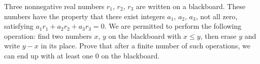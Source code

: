 Three nonnegative real numbers $ r_1$,  $ r_2$,  $ r_3$ are written on a blackboard. These numbers have the property that there exist integers $ a_1$,  $ a_2$,  $ a_3$,  not all zero, satisfying $ a_1r_1 + a_2r_2 + a_3r_3 = 0$. We are permitted to perform the following operation: find two numbers $ x$,  $ y$ on the blackboard with $ x \le y$,  then erase $ y$ and write $ y - x$ in its place. Prove that after a finite number of such operations, we can end up with at least one $ 0$ on the blackboard.